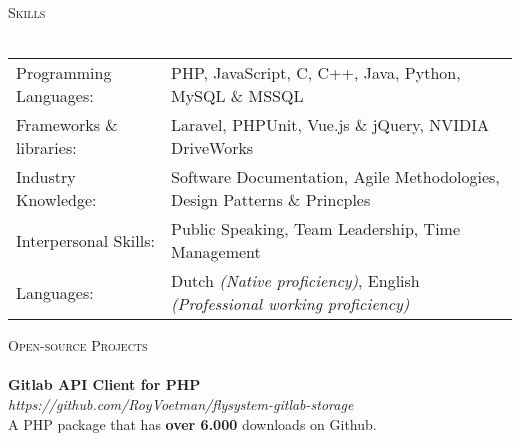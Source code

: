 \documentclass[a4paper]{article}
\newcommand{\lineunder} {
    \vspace*{-8pt} \\
    \hspace*{-18pt} \hrulefill \\
}
\newcommand{\header} [1] {
    {\hspace*{-18pt}\vspace*{6pt} \textsc{#1}}
    \vspace*{-6pt} \lineunder
}
\begin{document}
\vspace{5mm}

\header{Skills}
\vspace{2mm}
\begin{tabular}{l l}

	Programming Languages:   & PHP, JavaScript, C, C++, Java, Python, MySQL \& MSSQL
	\vspace{1mm}\\
	
    Frameworks \& libraries: & Laravel, PHPUnit, Vue.js \& jQuery, NVIDIA DriveWorks
    \vspace{1mm}\\
    
	Industry Knowledge:      & Software Documentation, Agile Methodologies, Design Patterns \& Princples
	\vspace{1mm}\\
	
	Interpersonal Skills:    & Public Speaking, Team Leadership, Time Management
	\vspace{1mm}\\
	
    Languages:               & Dutch \color{gray}\emph{(Native proficiency)}\color{black}, English \color{gray}\emph{(Professional working proficiency)}\color{black}\\
    
\end{tabular}
\vspace{2mm}

\vspace{5mm}

\header{Open-source Projects}
{\textbf{Gitlab API Client for PHP}} \\ \color{gray}\emph{https://github.com/RoyVoetman/flysystem-gitlab-storage}\color{black}\\
A PHP package that has \textbf{over 6.000} downloads on Github.
\vspace*{2mm}

\vspace{5mm}
\end{document}

